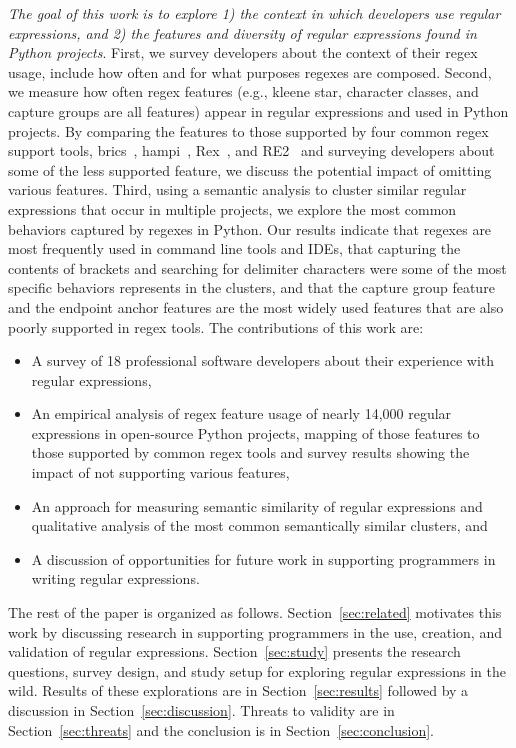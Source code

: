 \emph{The goal of this work is to explore 1) the context in which developers use regular expressions, and 2) the features and diversity of  regular expressions found in Python projects}.
First, we survey developers about the context of their regex usage, include how often and for what purposes regexes are composed.
Second, we measure how often regex features (e.g., kleene star, character classes, and capture groups are all features) appear in regular expressions and used in Python projects.
By comparing the features to those supported by four common regex support tools, brics~\cite{brics}, hampi~\cite{hampi}, Rex~\cite{rex}, and RE2~\cite{re2} and surveying developers about some of the less supported feature, we discuss the potential impact of omitting various features.
Third, using  a semantic analysis to cluster similar regular expressions that occur in multiple projects, we explore the most common behaviors captured by  regexes in Python.
Our results indicate that regexes are most frequently used in command line tools and IDEs, that capturing the contents of brackets and searching for delimiter characters were some of the most specific  behaviors represents in the clusters, and that the capture group feature and the endpoint anchor features are the most widely used features that are also poorly supported in regex tools.
The contributions of this work are:
\begin{itemize}
    \item A survey of 18 professional software developers about their experience with regular expressions,
	\item An empirical analysis of regex feature usage of nearly 14,000 regular expressions in  open-source Python projects, mapping of those features to those supported by common regex tools and survey results showing the impact of not supporting various features,
	\item An approach for measuring semantic similarity of regular expressions and qualitative analysis of the most common semantically similar clusters, and
	\item A discussion of opportunities for future work in supporting programmers in writing regular expressions.
\end{itemize}

The rest of the paper is organized as follows. Section~\ref{sec:related} motivates this work by discussing research in supporting programmers in the use, creation, and validation of regular expressions. Section~\ref{sec:study} presents the research questions, survey design, and study setup for exploring regular expressions in the wild. Results of these explorations are in Section~\ref{sec:results} followed by a discussion in Section~\ref{sec:discussion}. Threats to validity are in Section~\ref{sec:threats} and the conclusion is in Section~\ref{sec:conclusion}.
